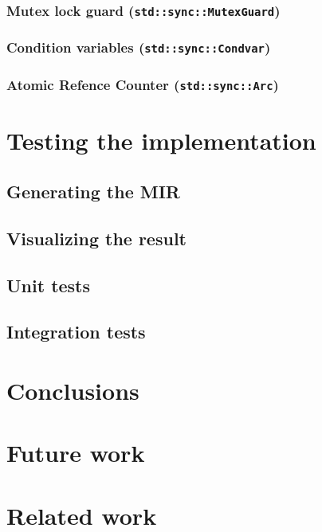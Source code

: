 \documentclass[12pt, oneside]{book}
\begin{document}
\subsection{Mutex lock guard (\texttt{std::sync::MutexGuard})}
\subsection{Condition variables (\texttt{std::sync::Condvar})}
\subsection{Atomic Refence Counter (\texttt{std::sync::Arc})}

\chapter{Testing the implementation}

\section{Generating the MIR}
\section{Visualizing the result}
\section{Unit tests}
\section{Integration tests}
\label{sec:integration-tests}

\chapter{Conclusions}

\chapter{Future work}
\label{chap:future-work}

\chapter{Related work}


\clearpage


\end{document}
